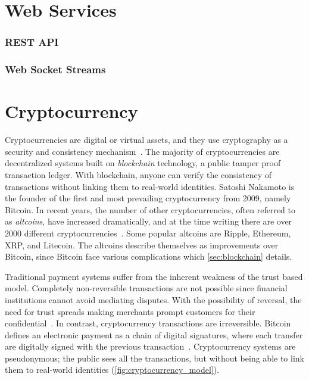 \section{Web Services}
\subsubsection{REST API}
\subsubsection{Web Socket Streams}
\fi

\section{Cryptocurrency}\label{sec:cryptocurrencies}
Cryptocurrencies are digital or virtual assets, and they use cryptography as a security and consistency mechanism~\cite{investopedia_cryptocurrency, P&D_to_the_moon}. The majority of cryptocurrencies are decentralized systems built on \emph{blockchain} technology, a public tamper proof transaction ledger. With blockchain, anyone can verify the consistency of transactions without linking them to real-world identities. Satoshi Nakamoto is the founder of the first and most prevailing cryptocurrency from 2009, namely Bitcoin. In recent years, the number of other cryptocurrencies, often referred to as \emph{altcoins}, have increased dramatically, and at the time writing there are over $2000$ different cryptocurrencies~\cite{coinmarketcap}. Some popular altcoins are Ripple, Ethereum, XRP, and Litecoin. The altcoins describe themselves as improvements over Bitcoin, since Bitcoin face various complications which \autoref{sec:blockchain} details.

Traditional payment systems suffer from the inherent weakness of the trust based model. Completely non-reversible transactions are not possible since financial institutions cannot avoid mediating disputes. With the possibility of reversal, the need for trust spreads making merchants prompt customers for their confidential~\cite{bitcoin}. In contrast, cryptocurrency transactions are irreversible. Bitcoin defines an electronic payment as a chain of digital signatures, where each transfer are digitally signed with the previous transaction~\cite{bitcoin, ethereum_white}. Cryptocurrency systems are pseudonymous; the public sees all the transactions, but without being able to link them to real-world identities (\autoref{fig:cryptocurrency_model}).

